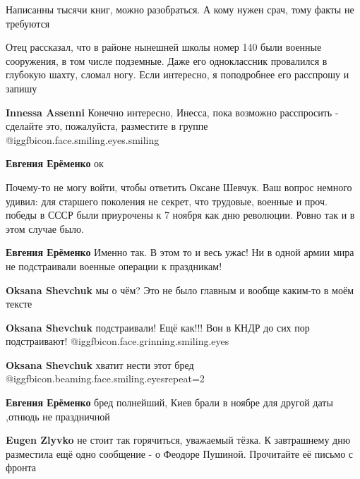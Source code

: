 \begin{itemize}
\begin{itemize}
Написанны тысячи книг, можно разобраться. А кому нужен срач, тому факты не требуются

\end{itemize} %


Отец рассказал, что в районе нынешней школы номер 140 были военные сооружения,
в том числе подземные. Даже его одноклассник провалился в глубокую шахту,
сломал ногу. Если интересно, я поподробнее его расспрошу и запишу

\begin{itemize} %
\textbf{Innessa Assenni} Конечно интересно, Инесса, пока возможно расспросить - сделайте это, пожалуйста, разместите в группе  @igg{fbicon.face.smiling.eyes.smiling} 

\textbf{Евгения Ерёменко} ок
\end{itemize} %


Почему-то не могу войти, чтобы ответить Оксане Шевчук. Ваш вопрос немного
удивил: для старшего поколения не секрет, что трудовые, военные и проч. победы в
СССР были приурочены к 7 ноября как дню революции. Ровно так и в этом случае
было.

\begin{itemize} %
\textbf{Евгения Ерёменко}
Именно так. В этом то и весь ужас!
Ни в одной армии мира не подстраивали военные операции к праздникам!

\begin{itemize} %
\textbf{Oksana Shevchuk} мы о чём? Это не было главным и вообще каким-то в моём тексте

\textbf{Oksana Shevchuk} подстраивали! Ещё как!!! Вон в КНДР до сих пор подстраивают! @igg{fbicon.face.grinning.smiling.eyes} 

\textbf{Oksana Shevchuk} хватит нести этот бред  @igg{fbicon.beaming.face.smiling.eyes}{repeat=2} 
\end{itemize} %

\textbf{Евгения Ерёменко} бред полнейший, Киев брали в ноябре для другой даты ,отнюдь не праздничной

\begin{itemize} %
\textbf{Eugen Zlyvko} не стоит так горячиться, уважаемый тёзка. К завтрашнему дню разместила ещё одно сообщение - о Феодоре Пушиной. Прочитайте её письмо с фронта
\end{itemize} %


\end{itemize}
\end{itemize}

